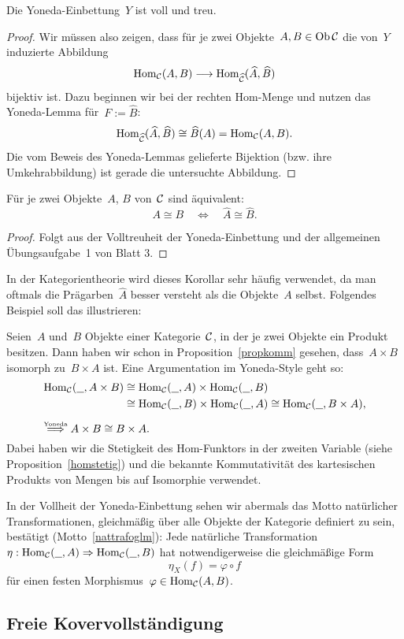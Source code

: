 \begin{kor}Die Yoneda-Einbettung~$Y$ ist voll und treu.\end{kor}
\begin{proof}
Wir müssen also zeigen, dass für je zwei Objekte~$A,B \in \operatorname{Ob}\mathcal{C}$ die von~$Y$
induzierte Abbildung
\[ \mathrm{Hom}_{\mathcal{C}}(A,B) \longrightarrow \mathrm{Hom}_{\widehat{\mathcal{C}}}(\widehat A,\widehat B) \]
bijektiv ist. Dazu beginnen wir bei der rechten Hom-Menge und nutzen das
Yoneda-Lemma für~$F := \widehat B$:
\[ \mathrm{Hom}_{\widehat{\mathcal{C}}}(\widehat A,\widehat B) \cong \widehat B(A) = \mathrm{Hom}_{\mathcal{C}}(A,B). \]
Die vom Beweis des Yoneda-Lemmas gelieferte Bijektion (bzw. ihre
Umkehrabbildung) ist gerade die untersuchte Abbildung.
\end{proof}

\begin{kor}Für je zwei Objekte~$A$, $B$ von~$\mathcal{C}$ sind äquivalent:
\[ A \cong B \quad\Longleftrightarrow\quad \widehat A \cong \widehat B. \]
\end{kor}
\begin{proof}Folgt aus der Volltreuheit der Yoneda-Einbettung und der
allgemeinen Übungs\-auf\-ga\-be~1 von Blatt 3.\end{proof}

In der Kategorientheorie wird dieses Korollar sehr häufig verwendet, da man
oftmals die Prägarben~$\widehat A$ besser versteht als die Objekte~$A$ selbst.
Folgendes Beispiel soll das illustrieren:
\begin{bsp}Seien~$A$ und~$B$ Objekte einer Kategorie~$\mathcal{C}$, in der je zwei
Objekte ein Produkt besitzen. Dann haben wir schon in Proposition~\ref{propkomm}
gesehen, dass~$A \times B$ isomorph zu~$B \times A$ ist. Eine Argumentation im
Yoneda-Style geht so:
\begin{align*}
  \Hom_\C(\freist, A \times B) &\cong
  \Hom_\C(\freist, A) \times \Hom_\C(\freist, B) \\
  &\cong \Hom_\C(\freist, B) \times \Hom_\C(\freist, A) \cong
  \Hom_\C(\freist, B \times A), \\[0.5em]
  \omit\rlap{$\stackrel{\text{\tiny Yoneda}}{\Longrightarrow} A \times B \cong B \times A.$}
\end{align*}
Dabei haben wir die Stetigkeit des Hom-Funktors in der zweiten Variable (siehe
Proposition~\ref{homstetig}) und die bekannte Kommutativität des kartesischen
Produkts von Mengen bis auf Isomorphie verwendet.
\end{bsp}

\begin{bem}In der Vollheit der Yoneda-Einbettung sehen wir abermals das Motto
natürlicher Transformationen, gleichmäßig über alle Objekte der Kategorie
definiert zu sein, bestätigt (Motto~\ref{nattrafoglm}): Jede natürliche
Transformation~$\eta : \mathrm{Hom}_{\mathcal{C}}(\underline{\ \ },A) \Rightarrow \mathrm{Hom}_{\mathcal{C}}(\underline{\ \ },B)$ hat
notwendigerweise die gleichmäßige Form
\[ \eta_X(f) = \varphi \circ f \]
für einen festen Morphismus~$\varphi \in \mathrm{Hom}_{\mathcal{C}}(A,B)$.\end{bem}


\subsection{Freie Kovervollständigung}


